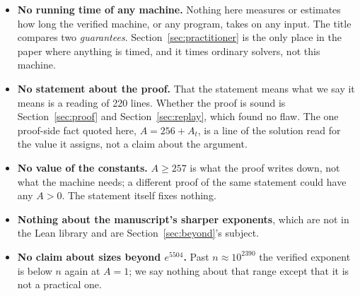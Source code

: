 \begin{itemize}
\item \textbf{No running time of any machine.} Nothing here measures or
  estimates how long the verified machine, or any program, takes on any
  input. The title compares two \emph{guarantees}.
  Section~\ref{sec:practitioner} is the only place in the paper where
  anything is timed, and it times ordinary solvers, not this machine.
\item \textbf{No statement about the proof.} That the statement means
  what we say it means is a reading of 220 lines. Whether the proof is
  sound is Section~\ref{sec:proof} and Section~\ref{sec:replay}, which
  found no flaw. The one proof-side fact quoted here, $A = 256 + A_t$,
  is a line of the solution read for the value it assigns, not a claim
  about the argument.
\item \textbf{No value of the constants.} $A \ge 257$ is what the proof
  writes down, not what the machine needs; a different proof of the
  same statement could have any $A > 0$. The statement itself fixes
  nothing.
\item \textbf{Nothing about the manuscript's sharper exponents}, which
  are not in the Lean library and are Section~\ref{sec:beyond}'s
  subject.
\item \textbf{No claim about sizes beyond $e^{5504}$.} Past
  $n \approx 10^{2390}$ the verified exponent is below $n$ again at
  $A = 1$; we say nothing about that range except that it is not a
  practical one.
\end{itemize}
\par\endgroup
